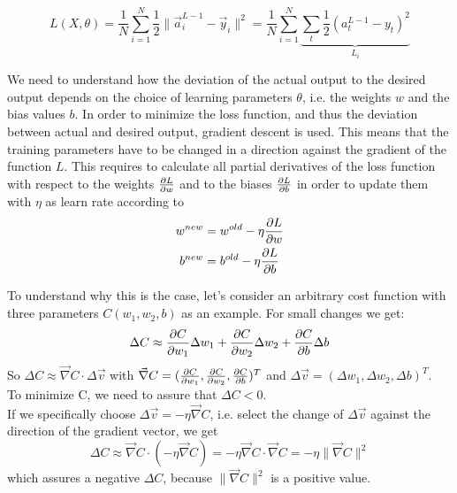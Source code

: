 \begin{equation}
    L(X,\theta) = \frac{1}{N}
    \sum_{i=1}^{N}{\frac{1}{2}\lVert \vec{a}^{L-1}_i - \vec{y}_i \rVert^2}
    = \frac{1}{N} \sum_{i=1}^{N}{\underbrace{\sum_{t}{\frac{1}{2} (a^{L-1}_t - y_t)^2}}_{L_i}}
    \label{eq:mse_loss_func}
\end{equation}

We need to understand how the deviation of the actual output to the desired output depends
on the choice of learning parameters $\theta$, i.e. the weights $w$ and the bias values
$b$. In order to minimize the loss function, and thus the deviation between actual and
desired output, gradient descent is used. This means that the training parameters have to
be changed in a direction against the gradient of the function $L$. This requires to
calculate all partial derivatives of the loss function with respect to the weights
$\frac{\partial {L}}{\partial {w}}$ and to the biases $\frac{\partial {L}}{\partial {b}}$ in order to update them with $\eta$ as learn
rate according to
\begin{subequations}
    \begin{align}
    w^{new} & =  w^{old} - \eta \frac{\partial {L}}{\partial {w}}
    \label{eq:update_weights} \\
    b^{new} & =  b^{old} - \eta \frac{\partial {L}}{\partial {b}}
    \label{eq:update_bias}
\end{align}
\end{subequations}

To understand why this is the case, let's consider an arbitrary cost function with three
parameters $C(w_1,w_2,b)$ as an example. For small changes we get:
\begin{equation}
    \Delta C \approx \frac{\partial {C}}{\partial {w_1}}\Delta w_1 + \frac{\partial {C}}{\partial {w_2}}\Delta w_2 +\frac{\partial {C}}{\partial {b}}\Delta b
\end{equation}
So $\Delta C \approx \vec{\nabla} C \cdot \Delta \vec{v}$ with $\vec{\nabla} C =
(\frac{\partial {C}}{\partial {w_1}}, \frac{\partial {C}}{\partial {w_2}}, \frac{\partial {C}}{\partial {b}})^T$ and $\Delta \vec{v} = (\Delta w_1, \Delta w_2,
\Delta b)^T$.\\

To minimize C, we need to assure that $\Delta C < 0$. \\

If we specifically choose $\Delta \vec{v} = -\eta \vec{\nabla} C$, i.e. select the change
of $\Delta \vec{v}$ against the direction of the gradient vector, we get
\begin{equation}
    \Delta C \approx \vec{\nabla} C \cdot (-\eta \vec{\nabla} C)
    = -\eta \vec{\nabla} C \cdot \vec{\nabla} C
    = -\eta \lVert \vec{\nabla} C \rVert ^2
\end{equation}
which assures a negative $\Delta C$, because $\lVert \vec{\nabla} C \rVert ^2$ is a
positive value. \\

